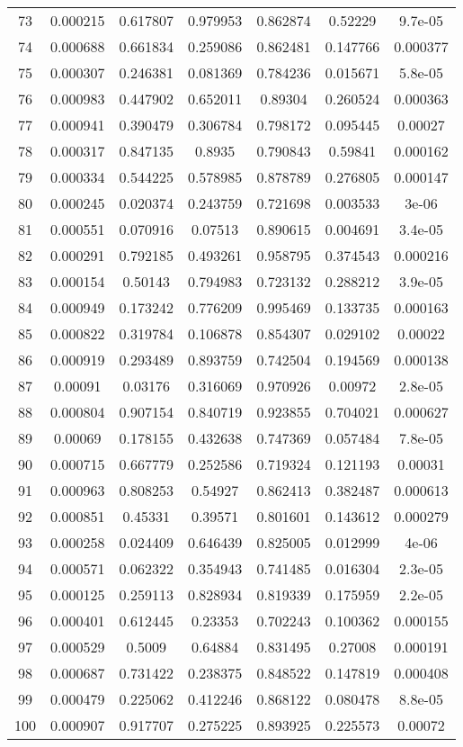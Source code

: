 \begin{table}
\begin{tabular}{c|c|c|c|c|c|c}
73 & 0.000215 & 0.617807 & 0.979953 & 0.862874 & 0.52229 & 9.7e-05\\
74 & 0.000688 & 0.661834 & 0.259086 & 0.862481 & 0.147766 & 0.000377\\
75 & 0.000307 & 0.246381 & 0.081369 & 0.784236 & 0.015671 & 5.8e-05\\
76 & 0.000983 & 0.447902 & 0.652011 & 0.89304 & 0.260524 & 0.000363\\
77 & 0.000941 & 0.390479 & 0.306784 & 0.798172 & 0.095445 & 0.00027\\
78 & 0.000317 & 0.847135 & 0.8935 & 0.790843 & 0.59841 & 0.000162\\
79 & 0.000334 & 0.544225 & 0.578985 & 0.878789 & 0.276805 & 0.000147\\
80 & 0.000245 & 0.020374 & 0.243759 & 0.721698 & 0.003533 & 3e-06\\
81 & 0.000551 & 0.070916 & 0.07513 & 0.890615 & 0.004691 & 3.4e-05\\
82 & 0.000291 & 0.792185 & 0.493261 & 0.958795 & 0.374543 & 0.000216\\
83 & 0.000154 & 0.50143 & 0.794983 & 0.723132 & 0.288212 & 3.9e-05\\
84 & 0.000949 & 0.173242 & 0.776209 & 0.995469 & 0.133735 & 0.000163\\
85 & 0.000822 & 0.319784 & 0.106878 & 0.854307 & 0.029102 & 0.00022\\
86 & 0.000919 & 0.293489 & 0.893759 & 0.742504 & 0.194569 & 0.000138\\
87 & 0.00091 & 0.03176 & 0.316069 & 0.970926 & 0.00972 & 2.8e-05\\
88 & 0.000804 & 0.907154 & 0.840719 & 0.923855 & 0.704021 & 0.000627\\
89 & 0.00069 & 0.178155 & 0.432638 & 0.747369 & 0.057484 & 7.8e-05\\
90 & 0.000715 & 0.667779 & 0.252586 & 0.719324 & 0.121193 & 0.00031\\
91 & 0.000963 & 0.808253 & 0.54927 & 0.862413 & 0.382487 & 0.000613\\
92 & 0.000851 & 0.45331 & 0.39571 & 0.801601 & 0.143612 & 0.000279\\
93 & 0.000258 & 0.024409 & 0.646439 & 0.825005 & 0.012999 & 4e-06\\
94 & 0.000571 & 0.062322 & 0.354943 & 0.741485 & 0.016304 & 2.3e-05\\
95 & 0.000125 & 0.259113 & 0.828934 & 0.819339 & 0.175959 & 2.2e-05\\
96 & 0.000401 & 0.612445 & 0.23353 & 0.702243 & 0.100362 & 0.000155\\
97 & 0.000529 & 0.5009 & 0.64884 & 0.831495 & 0.27008 & 0.000191\\
98 & 0.000687 & 0.731422 & 0.238375 & 0.848522 & 0.147819 & 0.000408\\
99 & 0.000479 & 0.225062 & 0.412246 & 0.868122 & 0.080478 & 8.8e-05\\
100 & 0.000907 & 0.917707 & 0.275225 & 0.893925 & 0.225573 & 0.00072\\
\end{tabular}
\end{table}

